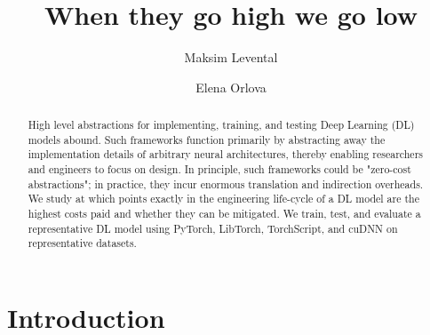 \documentclass[sigconf]{acmart}
\begin{document}
\title{When they go high we go low}

\author{Maksim Levental}
\author{Elena Orlova}

\renewcommand{\shortauthors}{Levental and Orlova}

\begin{abstract}
  High level abstractions for implementing, training, and testing Deep Learning (DL) models abound.
  Such frameworks function primarily by abstracting away the implementation details of arbitrary neural architectures, thereby enabling researchers and engineers to focus on design.
  In principle, such frameworks could be "zero-cost abstractions";
  in practice, they incur enormous translation and indirection overheads.
  We study at which points exactly in the engineering life-cycle of a DL model are the highest costs paid and whether they can be mitigated.
  We train, test, and evaluate a representative DL model using PyTorch, LibTorch, TorchScript, and cuDNN on representative datasets.
\end{abstract}

%

\maketitle

\section{Introduction}\label{sec:introduction}
\end{document}
